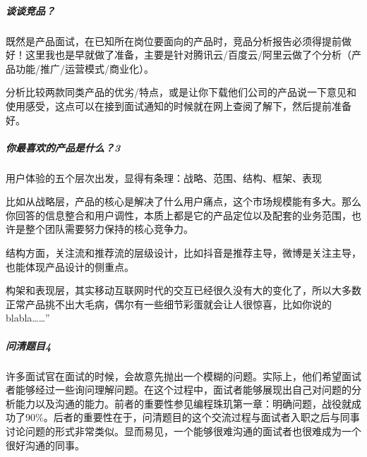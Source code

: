 \documentclass[letterpaper,10pt,english]{sphinxmanual}
\begin{document}
\subparagraph{谈谈竞品？}
\label{\detokenize{chapter_interview/question:id13}}
既然是产品面试，在已知所在岗位要面向的产品时，竞品分析报告必须得提前做好！这里我也是早就做了准备，主要是针对腾讯云/百度云/阿里云做了个分析（产品功能/推广/运营模式/商业化）。

分析比较两款同类产品的优劣/特点，或是让你下载他们公司的产品说一下意见和使用感受，这点可以在接到面试通知的时候就在网上查阅了解下，然后提前准备好。
%
\begin{footnote}[864]\sphinxAtStartFootnote
{}
%
\end{footnote}


\subparagraph{你最喜欢的产品是什么？3\sphinxfootnotemark[865]}
\label{\detokenize{chapter_interview/question:id14}}%
\begin{footnotetext}[865]\sphinxAtStartFootnote
{}
%
\end{footnotetext}\ignorespaces 
用户体验的五个层次出发，显得有条理：战略、范围、结构、框架、表现

比如从战略层，产品的核心是解决了什么用户痛点，这个市场规模能有多大。那么你回答的信息整合和用户调性，本质上都是它的产品定位以及配套的业务范围，也许是整个团队需要努力保持的核心竞争力。

结构方面，关注流和推荐流的层级设计，比如抖音是推荐主导，微博是关注主导，也能体现产品设计的侧重点。

构架和表现层，其实移动互联网时代的交互已经很久没有大的变化了，所以大多数正常产品挑不出大毛病，偶尔有一些细节彩蛋就会让人很惊喜，比如你说的blabla……”


\subparagraph{问清题目4\sphinxfootnotemark[866]}
\label{\detokenize{chapter_interview/question:id15}}%
\begin{footnotetext}[866]\sphinxAtStartFootnote
{}
%
\end{footnotetext}\ignorespaces 
许多面试官在面试的时候，会故意先抛出一个模糊的问题。实际上，他们希望面试者能够经过一些询问理解问题。在这个过程中，面试者能够展现出自己对问题的分析能力以及沟通的能力。前者的重要性参见编程珠玑第一章：明确问题，战役就成功了90\%。后者的重要性在于，问清题目的这个交流过程与面试者入职之后与同事讨论问题的形式非常类似。显而易见，一个能够很难沟通的面试者也很难成为一个很好沟通的同事。
\end{document}
